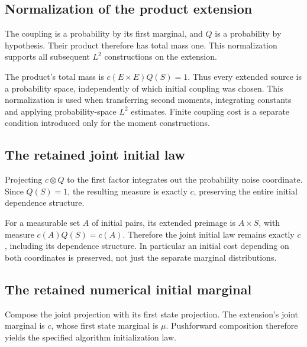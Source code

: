 \documentclass[11pt,a4paper]{report}
\begin{document}
\subsection{\texorpdfstring{Normalization of the product extension}{Normalization of the product extension}}
\label{report-step-UnadjustedLangevin-InitialExtension-lean-3}


The coupling is a probability by its first marginal, and \(Q\) is a probability by hypothesis. Their product therefore has total mass one. This normalization supports all subsequent \(L^2\) constructions on the extension.



The product's total mass is \(c(E\times E)Q(S)=1\). Thus every extended source is a probability space, independently of which initial coupling was chosen. This normalization is used when transferring second moments, integrating constants and applying probability-space \(L^2\) estimates. Finite coupling cost is a separate condition introduced only for the moment constructions.

\subsection{\texorpdfstring{The retained joint initial law}{The retained joint initial law}}
\label{report-step-UnadjustedLangevin-InitialExtension-lean-4}


Projecting \(c\otimes Q\) to the first factor integrates out the probability noise coordinate. Since \(Q(S)=1\), the resulting measure is exactly \(c\), preserving the entire initial dependence structure.



For a measurable set \(A\) of initial pairs, its extended preimage is \(A\times S\), with measure \(c(A)Q(S)=c(A)\). Therefore the joint initial law remains exactly \(c\), including its dependence structure. In particular an initial cost depending on both coordinates is preserved, not just the separate marginal distributions.

\subsection{\texorpdfstring{The retained numerical initial marginal}{The retained numerical initial marginal}}
\label{report-step-UnadjustedLangevin-InitialExtension-lean-5}


Compose the joint projection with its first state projection. The extension's joint marginal is \(c\), whose first state marginal is \(\mu\). Pushforward composition therefore yields the specified algorithm initialization law.
\end{document}

